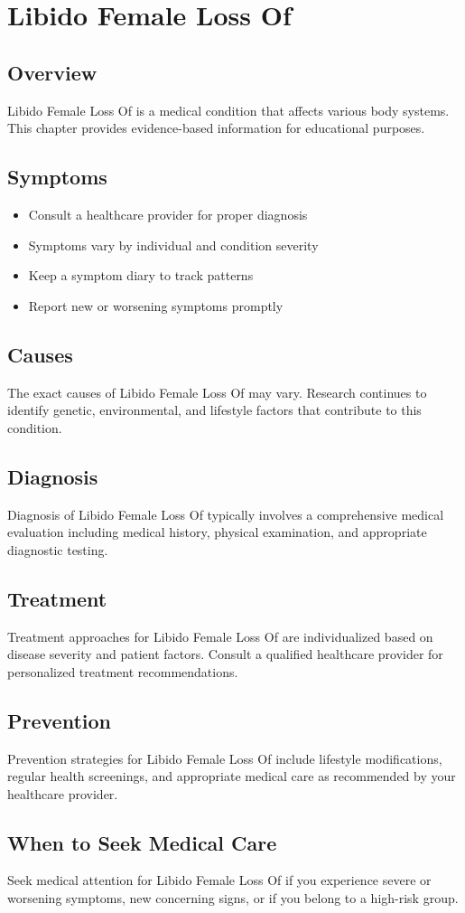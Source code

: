 \chapter{Libido Female Loss Of}

\section*{Overview}
Libido Female Loss Of is a medical condition that affects various body systems. This chapter provides evidence-based information for educational purposes.

\section*{Symptoms}
\begin{itemize}
  \item Consult a healthcare provider for proper diagnosis
  \item Symptoms vary by individual and condition severity
  \item Keep a symptom diary to track patterns
  \item Report new or worsening symptoms promptly
\end{itemize}

\section*{Causes}
The exact causes of Libido Female Loss Of may vary. Research continues to identify genetic, environmental, and lifestyle factors that contribute to this condition.

\section*{Diagnosis}
Diagnosis of Libido Female Loss Of typically involves a comprehensive medical evaluation including medical history, physical examination, and appropriate diagnostic testing.

\section*{Treatment}
Treatment approaches for Libido Female Loss Of are individualized based on disease severity and patient factors. Consult a qualified healthcare provider for personalized treatment recommendations.

\section*{Prevention}
Prevention strategies for Libido Female Loss Of include lifestyle modifications, regular health screenings, and appropriate medical care as recommended by your healthcare provider.

\section*{When to Seek Medical Care}
Seek medical attention for Libido Female Loss Of if you experience severe or worsening symptoms, new concerning signs, or if you belong to a high-risk group.
\clearpage
